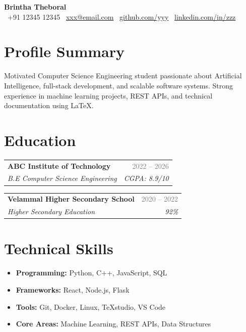 \documentclass[a4paper,10pt]{article}
\newcommand{\resumeSubheading}[4]{
	\vspace{2pt}
	\begin{tabularx}{\textwidth}{X r}
		\textbf{#1} & \textcolor{gray}{#2} \\
		\textit{#3} & \textit{#4} \\
	\end{tabularx}
}
\begin{document}
	
	
	\begin{center}
		{\Huge \textbf{Brintha Theboral}} \\[6pt]
		
		\faPhone \ +91 12345 12345 \quad
		\faEnvelope \ \href{mailto:xxx@email.com}{xxx@email.com} \quad
		\faGithub \ \href{https://github.com/yyy}{github.com/yyy} \quad
		\faLinkedin \ \href{https://linkedin.com/in/zzz}{linkedin.com/in/zzz}
	\end{center}
	
	
	\section*{Profile Summary}
	
	Motivated Computer Science Engineering student passionate about Artificial Intelligence, full-stack development, and scalable software systems. Strong experience in machine learning projects, REST APIs, and technical documentation using LaTeX.
	
	
	\section*{Education}
	
	\resumeSubheading
	{ABC Institute of Technology}{2022 -- 2026}
	{B.E Computer Science Engineering}{CGPA: 8.9/10}
	
	\resumeSubheading
	{Velammal Higher Secondary School}{2020 -- 2022}
	{Higher Secondary Education}{92\%}
	
	
	\section*{Technical Skills}
	
	\begin{itemize}[leftmargin=0.15in]
		\item{
			\textbf{Programming:} Python, C++, JavaScript, SQL
		}
		
		\item{
			\textbf{Frameworks:} React, Node.js, Flask
		}
		
		\item{
			\textbf{Tools:} Git, Docker, Linux, TeXstudio, VS Code
		}
		
		\item{
			\textbf{Core Areas:} Machine Learning, REST APIs, Data Structures
		}
	\end{itemize}
	
\end{document}
